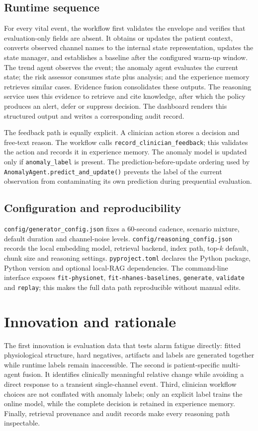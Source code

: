 \documentclass[11pt,a4paper]{article}
\begin{document}
\label{tab:modules}

\subsection{Runtime sequence}
For every vital event, the workflow first validates the envelope and verifies that evaluation-only fields are absent. It obtains or updates the patient context, converts observed channel names to the internal state representation, updates the state manager, and establishes a baseline after the configured warm-up window. The trend agent observes the event; the anomaly agent evaluates the current state; the risk assessor consumes state plus analysis; and the experience memory retrieves similar cases. Evidence fusion consolidates these outputs. The reasoning service uses this evidence to retrieve and cite knowledge, after which the policy produces an alert, defer or suppress decision. The dashboard renders this structured output and writes a corresponding audit record.

The feedback path is equally explicit. A clinician action stores a decision and free-text reason. The workflow calls \texttt{record\_clinician\_feedback}; this validates the action and records it in experience memory. The anomaly model is updated only if \texttt{anomaly\_label} is present. The prediction-before-update ordering used by \texttt{AnomalyAgent.predict\_and\_update()} prevents the label of the current observation from contaminating its own prediction during prequential evaluation.

\subsection{Configuration and reproducibility}
\texttt{config/generator\_config.json} fixes a 60-second cadence, scenario mixture, default duration and channel-noise levels. \texttt{config/reasoning\_config.json} records the local embedding model, retrieval backend, index path, top-$k$ default, chunk size and reasoning settings. \texttt{pyproject.toml} declares the Python package, Python version and optional local-RAG dependencies. The command-line interface exposes \texttt{fit-physionet}, \texttt{fit-nhanes-baselines}, \texttt{generate}, \texttt{validate} and \texttt{replay}; this makes the full data path reproducible without manual edits.

\section{Innovation and rationale}
The first innovation is evaluation data that tests alarm fatigue directly: fitted physiological structure, hard negatives, artifacts and labels are generated together while runtime labels remain inaccessible. The second is patient-specific multi-agent fusion. It identifies clinically meaningful relative change while avoiding a direct response to a transient single-channel event. Third, clinician workflow choices are not conflated with anomaly labels; only an explicit label trains the online model, while the complete decision is retained in experience memory. Finally, retrieval provenance and audit records make every reasoning path inspectable.
\end{document}
